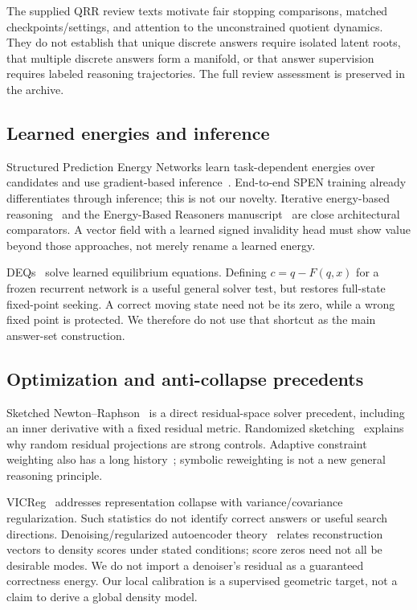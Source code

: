\documentclass[11pt,a4paper]{article}
\begin{document}
The supplied QRR review texts motivate fair stopping comparisons, matched checkpoints/settings, and attention to the unconstrained quotient dynamics. They do not establish that unique discrete answers require isolated latent roots, that multiple discrete answers form a manifold, or that answer supervision requires labeled reasoning trajectories. The full review assessment is preserved in the archive.

\subsection{Learned energies and inference}
Structured Prediction Energy Networks learn task-dependent energies over candidates and use gradient-based inference~\cite{spen,spenend}. End-to-end SPEN training already differentiates through inference; this is not our novelty. Iterative energy-based reasoning~\cite{irem} and the Energy-Based Reasoners manuscript~\cite{ebr} are close architectural comparators. A vector field with a learned signed invalidity head must show value beyond those approaches, not merely rename a learned energy.

DEQs~\cite{deq} solve learned equilibrium equations. Defining $c=q-F(q,x)$ for a frozen recurrent network is a useful general solver test, but restores full-state fixed-point seeking. A correct moving state need not be its zero, while a wrong fixed point is protected. We therefore do not use that shortcut as the main answer-set construction.

\subsection{Optimization and anti-collapse precedents}
Sketched Newton--Raphson~\cite{snr} is a direct residual-space solver precedent, including an inner derivative with a fixed residual metric. Randomized sketching~\cite{sketch} explains why random residual projections are strong controls. Adaptive constraint weighting also has a long history~\cite{breakout}; symbolic reweighting is not a new general reasoning principle.

VICReg~\cite{vicreg} addresses representation collapse with variance/covariance regularization. Such statistics do not identify correct answers or useful search directions. Denoising/regularized autoencoder theory~\cite{dae} relates reconstruction vectors to density scores under stated conditions; score zeros need not all be desirable modes. We do not import a denoiser's residual as a guaranteed correctness energy. Our local calibration is a supervised geometric target, not a claim to derive a global density model.
\end{document}
